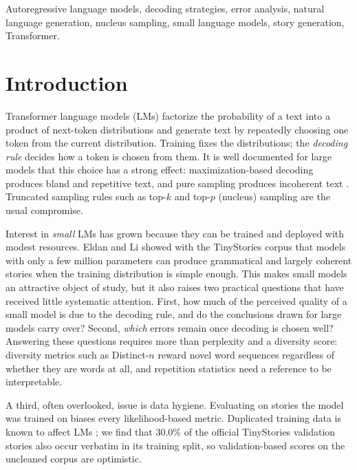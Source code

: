 \documentclass[journal]{IEEEtran}
\begin{document}
\begin{IEEEkeywords}
Autoregressive language models, decoding strategies, error analysis, natural language generation, nucleus sampling, small language models, story generation, Transformer.
\end{IEEEkeywords}

\section{Introduction}
\label{sec:intro}

 Transformer language models (LMs) \cite{vaswani2017attention,radford2018gpt,radford2019gpt2} factorize the probability of a text into a product of next-token distributions and generate text by repeatedly choosing one token from the current distribution. Training fixes the distributions; the \emph{decoding rule} decides how a token is chosen from them. It is well documented for large models that this choice has a strong effect: maximization-based decoding produces bland and repetitive text, and pure sampling produces incoherent text \cite{holtzman2020curious,fan2018hierarchical,welleck2020unlikelihood}. Truncated sampling rules such as top-$k$ \cite{fan2018hierarchical} and top-$p$ (nucleus) sampling \cite{holtzman2020curious} are the usual compromise.

Interest in \emph{small} LMs has grown because they can be trained and deployed with modest resources. Eldan and Li \cite{eldan2023tinystories} showed with the TinyStories corpus that models with only a few million parameters can produce grammatical and largely coherent stories when the training distribution is simple enough. This makes small models an attractive object of study, but it also raises two practical questions that have received little systematic attention. First, how much of the perceived quality of a small model is due to the decoding rule, and do the conclusions drawn for large models carry over? Second, \emph{which} errors remain once decoding is chosen well? Answering these questions requires more than perplexity and a diversity score: diversity metrics such as Distinct-$n$ \cite{li2016diversity} reward novel word sequences regardless of whether they are words at all, and repetition statistics need a reference to be interpretable.

A third, often overlooked, issue is data hygiene. Evaluating on stories the model was trained on biases every likelihood-based metric. Duplicated training data is known to affect LMs \cite{lee2022dedup}; we find that 30.0\% of the official TinyStories validation stories also occur verbatim in its training split, so validation-based scores on the uncleaned corpus are optimistic.
\end{document}
